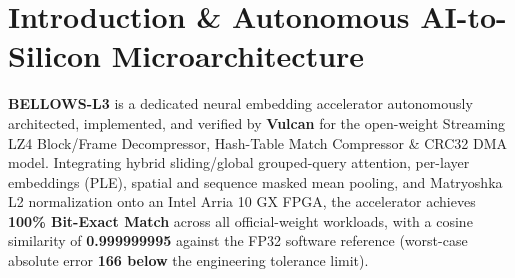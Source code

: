 \documentclass[11pt,a4paper]{article}
\begin{document}
\section{Introduction \& Autonomous AI-to-Silicon Microarchitecture}

\textbf{BELLOWS-L3} is a dedicated neural embedding accelerator autonomously architected, implemented, and verified by \textbf{Vulcan} for the open-weight Streaming LZ4 Block/\allowbreak{}Frame Decompressor,\allowbreak{} Hash-Table Match Compressor \& CRC32 DMA model. Integrating hybrid sliding/global grouped-query attention, per-layer embeddings (PLE), spatial and sequence masked mean pooling, and Matryoshka L2 normalization onto an Intel Arria 10 GX FPGA, the accelerator achieves \textbf{100\% Bit-Exact Match} across all official-weight workloads, with a cosine similarity of \textbf{0.999999995} against the FP32 software reference (worst-case absolute error \textbf{166\texttimes{} below} the engineering tolerance limit).

\vspace{2pt}
\end{document}
